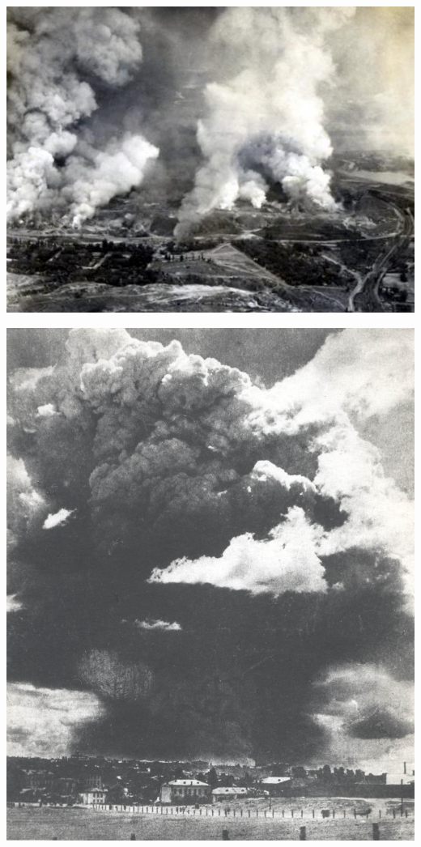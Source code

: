 \begin{center}
\includegraphics[width=\textwidth]{chast-vosp/zver/013.jpg}
\end{center}

\vspace*{\fill}

\newpage

\vspace*{\fill}


\begin{center}
\includegraphics[width=\textwidth]{chast-vosp/zver/zverinec_vzryv-1918.jpg}
\end{center}


